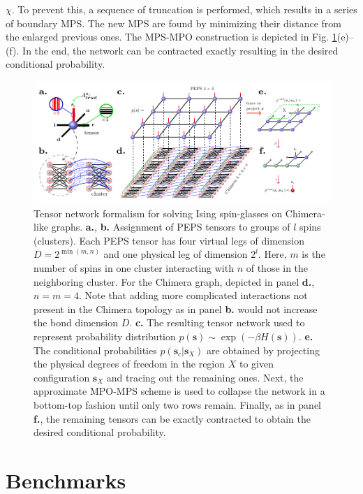 $\chi$. To prevent this, a sequence of truncation is performed, which results
in a series of boundary MPS. The new MPS are found by minimizing their distance
from the enlarged previous ones. The MPS-MPO construction is depicted in Fig.
\ref{fig:tensors}(e)--(f). In the end, the network can be contracted exactly
resulting in the desired conditional probability.
\begin{figure}
  \includegraphics[width=\textwidth]{figures/peps_overlay.pdf}
  \caption{
    Tensor network formalism for solving Ising spin-glasses on Chimera-like
    graphs. \textbf{a.}, \textbf{b.} Assignment of PEPS tensors to groups of $l$ spins (clusters).
    Each PEPS tensor has four virtual legs of dimension $D = 2^{\min(m,n)}$ and
    one physical leg of dimension $2^{l}$. Here, $m$ is the number of spins in one
    cluster interacting with $n$ of those in the neighboring cluster. For the Chimera
    graph, depicted in panel \textbf{d.}, $n=m=4$. Note that adding more complicated interactions not present
    in the Chimera topology as in panel \textbf{b.} would not increase the bond dimension $D$. \textbf{c.} The resulting tensor network
    used to represent probability distribution $p(\mathbf{s})\sim \exp(-\beta H(\mathbf{s}))$.
    \textbf{e.} The conditional probabilities $p(\mathbf{s}_{c}|\mathbf{s}_{X})$ are obtained
    by projecting the physical degrees of freedom in the region $X$ to given
    configuration $\mathbf{s}_{X}$ and tracing out the remaining ones. Next, the
    approximate MPO-MPS scheme is used to collapse the network in a bottom-top fashion
    until only two rows remain. Finally, as in panel \textbf{f.}, the remaining tensors can be exactly contracted to
    obtain the desired conditional probability.
  } \label{fig:tensors}
\end{figure}

\section{Benchmarks}

